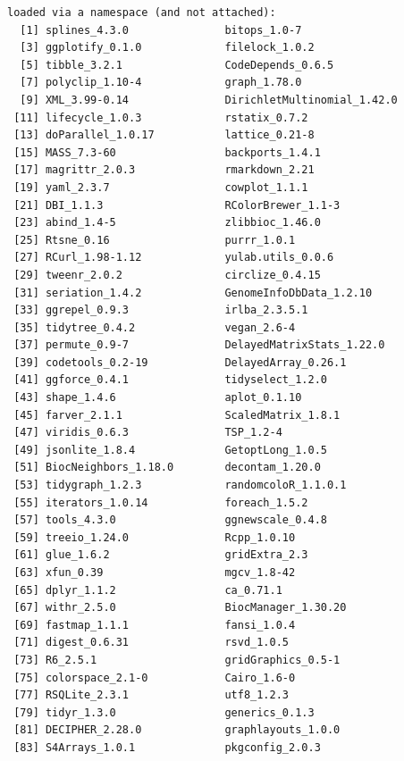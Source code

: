 \documentclass[
]{book}
\begin{document}
\begin{verbatim}
loaded via a namespace (and not attached):
  [1] splines_4.3.0               bitops_1.0-7               
  [3] ggplotify_0.1.0             filelock_1.0.2             
  [5] tibble_3.2.1                CodeDepends_0.6.5          
  [7] polyclip_1.10-4             graph_1.78.0               
  [9] XML_3.99-0.14               DirichletMultinomial_1.42.0
 [11] lifecycle_1.0.3             rstatix_0.7.2              
 [13] doParallel_1.0.17           lattice_0.21-8             
 [15] MASS_7.3-60                 backports_1.4.1            
 [17] magrittr_2.0.3              rmarkdown_2.21             
 [19] yaml_2.3.7                  cowplot_1.1.1              
 [21] DBI_1.1.3                   RColorBrewer_1.1-3         
 [23] abind_1.4-5                 zlibbioc_1.46.0            
 [25] Rtsne_0.16                  purrr_1.0.1                
 [27] RCurl_1.98-1.12             yulab.utils_0.0.6          
 [29] tweenr_2.0.2                circlize_0.4.15            
 [31] seriation_1.4.2             GenomeInfoDbData_1.2.10    
 [33] ggrepel_0.9.3               irlba_2.3.5.1              
 [35] tidytree_0.4.2              vegan_2.6-4                
 [37] permute_0.9-7               DelayedMatrixStats_1.22.0  
 [39] codetools_0.2-19            DelayedArray_0.26.1        
 [41] ggforce_0.4.1               tidyselect_1.2.0           
 [43] shape_1.4.6                 aplot_0.1.10               
 [45] farver_2.1.1                ScaledMatrix_1.8.1         
 [47] viridis_0.6.3               TSP_1.2-4                  
 [49] jsonlite_1.8.4              GetoptLong_1.0.5           
 [51] BiocNeighbors_1.18.0        decontam_1.20.0            
 [53] tidygraph_1.2.3             randomcoloR_1.1.0.1        
 [55] iterators_1.0.14            foreach_1.5.2              
 [57] tools_4.3.0                 ggnewscale_0.4.8           
 [59] treeio_1.24.0               Rcpp_1.0.10                
 [61] glue_1.6.2                  gridExtra_2.3              
 [63] xfun_0.39                   mgcv_1.8-42                
 [65] dplyr_1.1.2                 ca_0.71.1                  
 [67] withr_2.5.0                 BiocManager_1.30.20        
 [69] fastmap_1.1.1               fansi_1.0.4                
 [71] digest_0.6.31               rsvd_1.0.5                 
 [73] R6_2.5.1                    gridGraphics_0.5-1         
 [75] colorspace_2.1-0            Cairo_1.6-0                
 [77] RSQLite_2.3.1               utf8_1.2.3                 
 [79] tidyr_1.3.0                 generics_0.1.3             
 [81] DECIPHER_2.28.0             graphlayouts_1.0.0         
 [83] S4Arrays_1.0.1              pkgconfig_2.0.3            

\end{verbatim}
\end{document}
